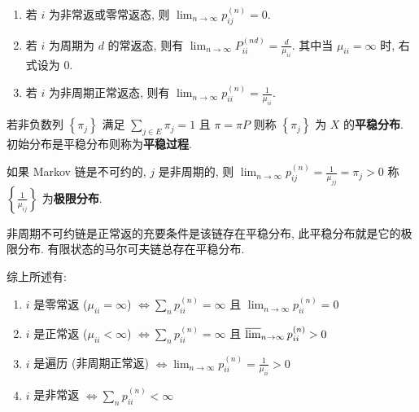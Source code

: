 \documentclass[10pt]{yerbaformat}
\begin{document}
\begin{theorem}[基本极限定理]
    \ 
    \begin{enumerate}
        \item 若 $i$ 为非常返或零常返态, 则 $\lim _{n \rightarrow \infty} p_{i j}^{(n)}=0 .$
        \item 若 $i$ 为周期为 $d$ 的常返态, 则有 $\lim _{n \rightarrow \infty} P_{i i}^{(n d)}=\frac{d}{\mu_{i i}}$.
              其中当 $\mu_{i i}=\infty$ 时, 右式设为 $0.$
        \item 若 $i$ 为非周期正常返态, 则有 $\lim _{n \rightarrow \infty} p_{i i}^{(n)}=\frac{1}{\mu_{i i}}$.
    \end{enumerate}
\end{theorem}

\begin{definition}[平稳分布]
    若非负数列 $\left\{\pi_{j}\right\}$ 满足 $\sum_{j \in E} \pi_{j}=1$ 且 $\pi = \pi P$
    则称 $\left\{\pi_{j}\right\}$ 为 $X$ 的\textbf{平稳分布}. 初始分布是平稳分布则称为\textbf{平稳过程}.
\end{definition}

\begin{lemma}
    如果 Markov 链是不可约的, $j$ 是非周期的, 则 $\lim _{n \rightarrow \infty} p_{i j}^{(n)}=\frac{1}{\mu_{j j}} = \pi _{j}>0$ 称 $\left\{\frac{1}{\mu_{i j}}\right\}$ 为\textbf{极限分布}.
\end{lemma}

\begin{theorem}
    非周期不可约链是正常返的充要条件是该链存在平稳分布, 此平稳分布就是它的极限分布. 有限状态的马尔可夫链总存在平稳分布.
\end{theorem}

\par 综上所述有:
\begin{enumerate}
    \item $i$ 是零常返 ($\mu_{i i}=\infty$) $\Leftrightarrow \sum_{n} p_{i i}^{(n)}=\infty$ 且 $\lim _{n \rightarrow \infty} p_{i i}^{(n)}=0$
    \item $i$ 是正常返 ($\mu_{i i}<\infty$) $\Leftrightarrow \sum_{n} p_{i i}^{(n)}=\infty$ 且 $\varlimsup_{n \rightarrow \infty} p_{i i}^{(n)}>0$
    \item $i$ 是遍历 (非周期正常返) $\Leftrightarrow \lim _{n \rightarrow \infty} p_{i i}^{(n)}=\frac{1}{\mu_{i i}}>0$
    \item $i$ 是非常返 $\Leftrightarrow \sum_{n} p_{i i}^{(n)}<\infty $
\end{enumerate}
\end{document}

